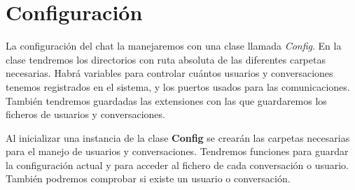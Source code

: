 \section{Configuración}
La configuración del chat la manejaremos con una clase llamada \textit{Config}.
En la clase tendremos los directorios con ruta absoluta de las diferentes carpetas necesarias.
Habrá variables para controlar cuántos usuarios y conversaciones tenemos registrados en el sistema, y los puertos usados para las comunicaciones.
También tendremos guardadas las extensiones con las que guardaremos los ficheros de usuarios y conversaciones.

Al inicializar una instancia de la clase \textbf{Config} se crearán las carpetas necesarias para el manejo de usuarios y conversaciones.
Tendremos funciones para guardar la configuración actual y para acceder al fichero de cada conversación o usuario. También podremos comprobar si existe un usuario o conversación.